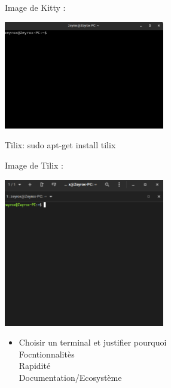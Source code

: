 \documentclass[12pt]{article}
\begin{document}
Image de Kitty : 

\vspace{0.3cm}

\begin{center}
  \includegraphics[width=7cm]{Images-TD-Env-Efficiency/Image-TD-9/Kitty.png}
\end{center}

\newpage

\vspace{0.3cm}

Tilix: sudo apt-get install tilix

\vspace{0.3cm}

Image de Tilix : 

\vspace{0.3cm}

\begin{center}
  \includegraphics[width=7cm]{Images-TD-Env-Efficiency/Image-TD-9/Tilix.png}
\end{center}

\vspace{0.3cm}

\begin{itemize}
  \item Choisir un terminal et justifier pourquoi \\
  Focntionnalitès\\
  Rapidité\\
  Documentation/Ecosystème
\end{itemize}
\end{document}
